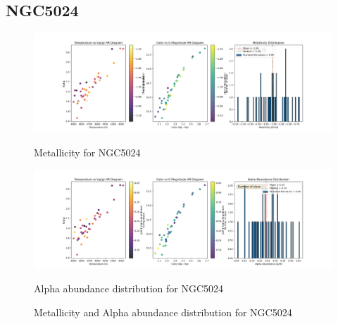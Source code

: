 \documentclass[a4paper,12pt]{article}
\begin{document}
\subsection{NGC5024}
\begin{figure}[H]
    \centering
    \begin{minipage}[b]{0.8\textwidth}
        \centering
        \includegraphics[width=\textwidth]{NGC5024_metalicity.png}
        \caption{Metallicity for NGC5024}
        \label{fig:NGC5024_metalicity}
    \end{minipage}
    \hfill
    \begin{minipage}[b]{0.8\textwidth}
        \centering
        \includegraphics[width=\textwidth]{NGC5024_alpha.png}
        \caption{Alpha abundance distribution for NGC5024}
        \label{fig:NGC5024_alpha}
    \end{minipage}
    \caption{Metallicity and Alpha abundance distribution for NGC5024}
    \label{fig:NGC5024_combined}
\end{figure}
\clearpage
\end{document}
